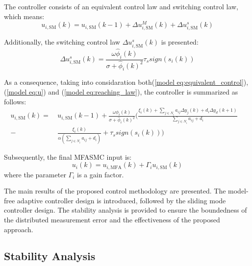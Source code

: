 \documentclass[journal,onecolumn]{IEEEtran}
\begin{document}
The controller consists of an equivalent control law and switching control law, which means:
\begin{equation}
    \label{model eq:u}
    u_{i,\text{SM}}(k) = u_{i,\text{SM}}(k-1) + \Delta u_{i,\text{SM}}^M(k)+ \Delta u_{i,\text{SM}}^s(k)
\end{equation}

Additionally, the switching control law $ \Delta u_{i,\text{SM}}^s(k) $ is presented:
\begin{equation}
    \label{model eq:reaching_law}
    \Delta u_{i,\text{SM}}^s(k) = \frac{\omega \hat{\phi}_i(k)}{\sigma + \hat{\phi}_i(k)^2}\tau_s sign(s_i(k))
\end{equation}

As a consequence, taking into considaration both(\ref{model eq:equivalent_control}), (\ref{model eq:u}) and (\ref{model eq:reaching_law}), the controller is summarized as follows:
\begin{align}
    \label{model eq:sm_controller}
    u_{i,\text{SM}}(k) =\ & u_{i,\text{SM}}(k-1) +  \frac{\omega \hat{\phi}_i(k)}{\sigma + \hat{\phi}_i(k)^2} \bigg( \frac{\xi_i(k)+ \sum_{j \in N_i}a_{ij} \Delta y_j(k) + d_i \Delta y_d(k+1)}{\sum_{j \in N_i}a_{ij}+d_i} \quad \nonumber  \\
    - \ & \frac{\xi_i(k)}{\alpha(\displaystyle \sum_{j \in N_i}a_{ij}+d_i)} + \tau_s sign(s_i(k)) \bigg)
\end{align}
    
Subsequently, the final MFASMC input is:
\begin{equation}
    \label{model eq:mfasmc}
    u_i(k) = u_{i,\text{MFA}}(k) + \Gamma_i  u_{i,\text{SM}}(k)
\end{equation}
where the parameter \(\Gamma_i\) is a gain factor.

The main results of the proposed control methodology are presented. The model-free adaptive controller design is introduced, followed by the sliding mode controller design. The stability analysis is provided to ensure the boundedness of the distributed measurement error and the effectiveness of the proposed approach.

\subsection{Stability Analysis}
\end{document}
